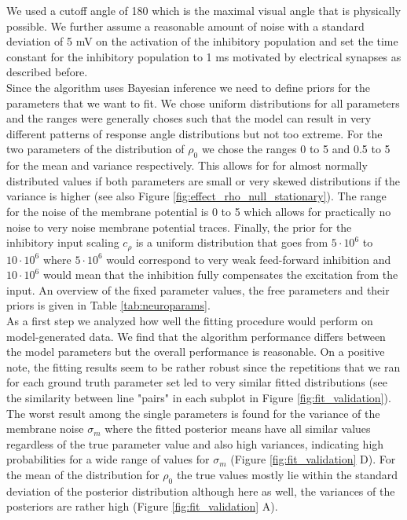 \documentclass[a4paper,10pt,hidelinks]{scrreprt}
\begin{document}
    We used a cutoff angle of 180\textdegree{} which is the maximal visual angle that is physically possible.
    We further assume a reasonable amount of noise with a standard deviation of 5 mV on the activation of the inhibitory population and set the time constant for the inhibitory population to 1 ms motivated by electrical synapses as described before.\\
    Since the algorithm uses Bayesian inference we need to define priors for the parameters that we want to fit.
    We chose uniform distributions for all parameters and the ranges were generally choses such that the model can result in very different patterns of response angle distributions but not too extreme.
    For the two parameters of the distribution of $\rho_0$ we chose the ranges 0 to 5 and 0.5 to 5 for the mean and variance respectively.
    This allows for for almost normally distributed values if both parameters are small or very skewed distributions if the variance is higher (see also Figure \ref{fig:effect_rho_null_stationary}).
    The range for the noise of the membrane potential is 0 to 5 which allows for practically no noise to very noise membrane potential traces.
    Finally, the prior for the inhibitory input scaling $c_{\rho}$ is a uniform distribution that goes from $5\cdot 10^{6}$ to $10\cdot 10^{6}$ where $5\cdot 10^{6}$ would correspond to very weak feed-forward inhibition and $10\cdot 10^6$ would mean that the inhibition fully compensates the excitation from the input.
    An overview of the fixed parameter values, the free parameters and their priors is given in Table \ref{tab:neuroparams}.\\
    As a first step we analyzed how well the fitting procedure would perform on model-generated data.
    We find that the algorithm performance differs between the model parameters but the overall performance is reasonable.
    On a positive note, the fitting results seem to be rather robust since the repetitions that we ran for each ground truth parameter set led to very similar fitted distributions (see the similarity between line "pairs" in each subplot in Figure \ref{fig:fit_validation}).
    The worst result among the single parameters is found for the variance of the membrane noise $\sigma_m$ where the fitted posterior means have all similar values regardless of the true parameter value and also high variances, indicating high probabilities for a wide range of values for $\sigma_m$ (Figure \ref{fig:fit_validation} D).
    For the mean of the distribution for $\rho_{0}$ the true values mostly lie within the standard deviation of the posterior distribution although here as well, the variances of the posteriors are rather high (Figure \ref{fig:fit_validation} A).
\end{document}
